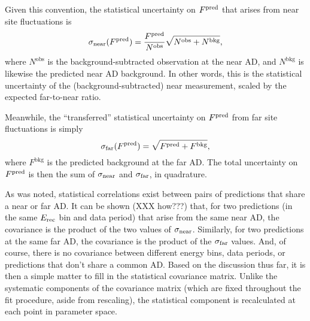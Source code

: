 \documentclass[../thesis.tex]{subfiles}
\begin{document}
Given this convention, the statistical uncertainty on $F^{\mathrm{pred}}$ that arises from near site fluctuations is
\begin{equation}
  \sigma_{\mathrm{near}}(F^{\mathrm{pred}}) = \frac{F^{\mathrm{pred}}}{N^{\mathrm{obs}}} \sqrt{N^{\mathrm{obs}} + N^{\mathrm{bkg}}},
\end{equation}
where $N^{\mathrm{obs}}$ is the background-subtracted observation at the near AD, and $N^{\mathrm{bkg}}$ is likewise the predicted near AD background. In other words, this is the statistical uncertainty of the (background-subtracted) near measurement, scaled by the expected far-to-near ratio.

Meanwhile, the ``transferred'' statistical uncertainty on $F^{\mathrm{pred}}$ from far site fluctuations is simply
\begin{equation}
  \sigma_{\mathrm{far}}(F^{\mathrm{pred}}) = \sqrt{F^{\mathrm{pred}} + F^{\mathrm{bkg}}},
\end{equation}
where $F^{\mathrm{bkg}}$ is the predicted background at the far AD. The total uncertainty on $F^{\mathrm{pred}}$ is then the sum of $\sigma_{\mathrm{near}}$ and $\sigma_{\mathrm{far}}$, in quadrature.

As was noted, statistical correlations exist between pairs of predictions that share a near or far AD. It can be shown (XXX how???) that, for two predictions (in the same $E_\mathrm{rec}$ bin and data period) that arise from the same near AD, the covariance is the product of the two values of $\sigma_{\mathrm{near}}$. Similarly, for two predictions at the same far AD, the covariance is the product of the $\sigma_{\mathrm{far}}$ values. And, of course, there is no covariance between different energy bins, data periods, or predictions that don't share a common AD. Based on the discussion thus far, it is then a simple matter to fill in the statistical covariance matrix. Unlike the systematic components of the covariance matrix (which are fixed throughout the fit procedure, aside from rescaling), the statistical component is recalculated at each point in parameter space.
\end{document}
